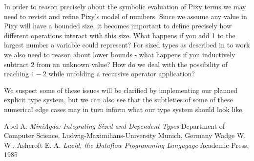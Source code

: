 \documentclass{scrartcl}
\begin{document}
    In order to reason precisely about the symbolic evaluation of Pixy terms we may need to revisit and refine Pixy's model of numbers. Since we assume any value in Pixy will have a bounded size, it becomes important to define precisely how different operations interact with this size. What happens if you add 1 to the largest number a variable could represent? For sized types as described in \cite{abel} to work we also need to reason about lower bounds - what happens if you inductively subtract 2 from an unknown value? How do we deal with the possibility of reaching $1-2$ while unfolding a recursive operator application?
    
    We suspect some of these issues will be clarified by implementing our planned explicit type system, but we can also see that the subtleties of some of these numerical edge cases may in turn inform what our type system should look like.
    
    \begin{thebibliography}{9}
        Abel A.
        \textit{MiniAgda: Integrating Sized and Dependent Types}
        Department of Computer Science,
        Ludwig-Maximilians-University Munich, Germany
        Wadge W. W.,
        Ashcroft E. A.
        \textit{Lucid, the Dataflow Programming Langugage}
        Academic Press, 1985
    \end{thebibliography}
    
\end{document}
